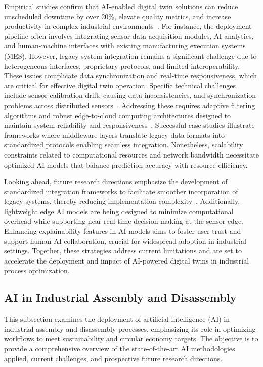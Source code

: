 \documentclass[sigconf]{acmart}
\begin{document}
Empirical studies confirm that AI-enabled digital twin solutions can reduce unscheduled downtime by over 20\%, elevate quality metrics, and increase productivity in complex industrial environments~\cite{ref31,ref36}. For instance, the deployment pipeline often involves integrating sensor data acquisition modules, AI analytics, and human-machine interfaces with existing manufacturing execution systems (MES). However, legacy system integration remains a significant challenge due to heterogeneous interfaces, proprietary protocols, and limited interoperability. These issues complicate data synchronization and real-time responsiveness, which are critical for effective digital twin operation. Specific technical challenges include sensor calibration drift, causing data inconsistencies, and synchronization problems across distributed sensors~\cite{ref45}. Addressing these requires adaptive filtering algorithms and robust edge-to-cloud computing architectures designed to maintain system reliability and responsiveness~\cite{ref34}. Successful case studies illustrate frameworks where middleware layers translate legacy data formats into standardized protocols enabling seamless integration. Nonetheless, scalability constraints related to computational resources and network bandwidth necessitate optimized AI models that balance prediction accuracy with resource efficiency.

Looking ahead, future research directions emphasize the development of standardized integration frameworks to facilitate smoother incorporation of legacy systems, thereby reducing implementation complexity~\cite{ref33,ref38}. Additionally, lightweight edge AI models are being designed to minimize computational overhead while supporting near-real-time decision-making at the sensor edge. Enhancing explainability features in AI models aims to foster user trust and support human-AI collaboration, crucial for widespread adoption in industrial settings. Together, these strategies address current limitations and are set to accelerate the deployment and impact of AI-powered digital twins in industrial process optimization.

\subsection{AI in Industrial Assembly and Disassembly}

This subsection examines the deployment of artificial intelligence (AI) in industrial assembly and disassembly processes, emphasizing its role in optimizing workflows to meet sustainability and circular economy targets. The objective is to provide a comprehensive overview of the state-of-the-art AI methodologies applied, current challenges, and prospective future research directions.
\end{document}
